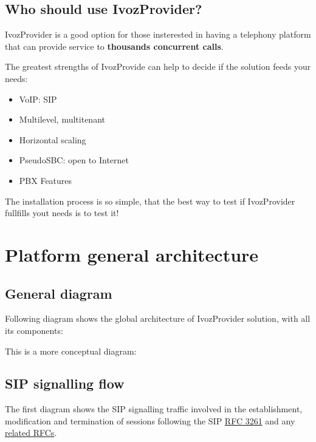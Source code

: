 \documentclass[letterpaper,10pt,english]{sphinxmanual}
\begin{document}
\section{Who should use IvozProvider?}
\label{basics/intro/use_cases::doc}\label{basics/intro/use_cases:who-should-use-ivozprovider}
IvozProvider is a good option for those insterested in having a telephony
platform that can provide service to \textbf{thousands concurrent calls}.

The greatest strengths of IvozProvide can help to decide if the solution
feeds your needs:
\begin{itemize}
\item {} 
VoIP: SIP

\item {} 
Multilevel, multitenant

\item {} 
Horizontal scaling

\item {} 
PseudoSBC: open to Internet

\item {} 
PBX Features

\end{itemize}

The installation process is so simple, that the best way to test if
IvozProvider fullfills yout needs is to test it!


\chapter{Platform general architecture}
\label{basics/architecture/index:platform-general-architecture}\label{basics/architecture/index::doc}\label{basics/architecture/index:architecture}

\section{General diagram}
\label{basics/architecture/index:general-diagram}
Following diagram shows the global architecture of IvozProvider solution,
with all its components:

\noindent{}

This is a more conceptual diagram:

\noindent{}


\section{SIP signalling flow}
\label{basics/architecture/index:sip-signalling-flow}\label{basics/architecture/index:signallingflow}
The first diagram shows the SIP signalling traffic involved in the
establishment, modification and termination of sessions following the SIP
\href{https://tools.ietf.org/html/rfc3261}{RFC 3261} and any \href{https://www.packetizer.com/ipmc/sip/standards.html}{related RFCs}.
\end{document}
